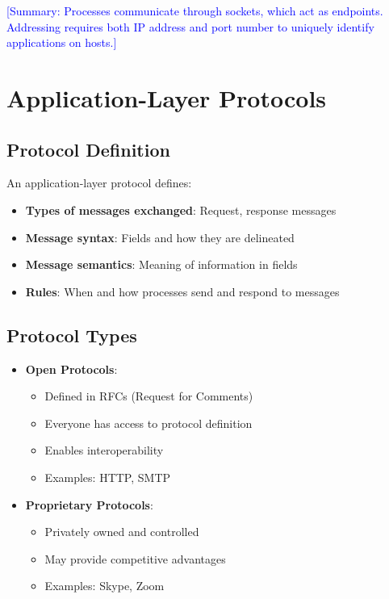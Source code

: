 \documentclass[12pt]{article}
\begin{document}
\textcolor{blue}{[Summary: Processes communicate through sockets, which act as endpoints. Addressing requires both IP address and port number to uniquely identify applications on hosts.]}

\section{Application-Layer Protocols}

\subsection{Protocol Definition}
An application-layer protocol defines:
\begin{itemize}
    \item \textbf{Types of messages exchanged}: Request, response messages
    \item \textbf{Message syntax}: Fields and how they are delineated
    \item \textbf{Message semantics}: Meaning of information in fields
    \item \textbf{Rules}: When and how processes send and respond to messages
\end{itemize}

\subsection{Protocol Types}
\begin{itemize}
    \item \textbf{Open Protocols}:
          \begin{itemize}
              \item Defined in RFCs (Request for Comments)
              \item Everyone has access to protocol definition
              \item Enables interoperability
              \item Examples: HTTP, SMTP
          \end{itemize}
    \item \textbf{Proprietary Protocols}:
          \begin{itemize}
              \item Privately owned and controlled
              \item May provide competitive advantages
              \item Examples: Skype, Zoom
          \end{itemize}
\end{itemize}
\end{document}
